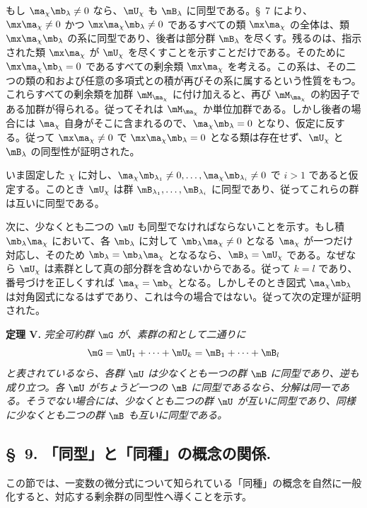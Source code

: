 \documentclass[11pt]{article}
\begin{document}
もし $\ma_\chi\mb_\lambda\ne0$ なら、$\mU_\chi$ も $\mB_\lambda$ に同型である。\S~7 により、$\mx\ma_\chi\ne0$ かつ $\mx\ma_\chi\mb_\lambda\ne0$ であるすべての類 $\mx\ma_\chi$ の全体は、類 $\mx\ma_\chi\mb_\lambda$ の系に同型であり、後者は部分群 $\mB_\lambda$ を尽くす。残るのは、指示された類 $\mx\ma_\chi$ が $\mU_\chi$ を尽くすことを示すことだけである。そのために $\mx\ma_\chi\mb_\lambda=0$ であるすべての剰余類 $\mx\ma_\chi$ を考える。この系は、その二つの類の和および任意の多項式との積が再びその系に属するという性質をもつ。これらすべての剰余類を加群 $\mM_{\ma_\chi}$ に付け加えると、再び $\mM_{\ma_\chi}$ の約因子である加群が得られる。従ってそれは $\mM_{\ma_\chi}$ か単位加群である。しかし後者の場合には $\ma_\chi$ 自身がそこに含まれるので、$\ma_\chi\mb_\lambda=0$ となり、仮定に反する。従って $\mx\ma_\chi\ne0$ で $\mx\ma_\chi\mb_\lambda=0$ となる類は存在せず、$\mU_\chi$ と $\mB_\lambda$ の同型性が証明された。

いま固定した $\chi$ に対し、$\ma_\chi\mb_{\lambda_1}\ne0,
\ldots,\ma_\chi\mb_{\lambda_i}\ne0$ で $i>1$ であると仮定する。このとき $\mU_\chi$ は群 $\mB_{\lambda_1},\ldots,\mB_{\lambda_i}$ に同型であり、従ってこれらの群は互いに同型である。

次に、少なくとも二つの $\mU$ も同型でなければならないことを示す。もし積 $\mb_\lambda\ma_\chi$ において、各 $\mb_\lambda$ に対して $\mb_\lambda\ma_\chi\ne0$ となる $\ma_\chi$ が一つだけ対応し、そのため $\mb_\lambda=\mb_\lambda\ma_\chi$ となるなら、$\mB_\lambda=\mU_\chi$ である。なぜなら $\mU_\chi$ は素群として真の部分群を含めないからである。従って $k=l$ であり、番号づけを正しくすれば $\ma_\chi=\mb_\chi$ となる。しかしそのとき図式 $\ma_\chi\mb_\lambda$ は対角図式になるはずであり、これは今の場合ではない。従って次の定理が証明された。

\textbf{定理 V.} \emph{完全可約群 $\mG$ が、素群の和として二通りに
\[
 \mG=\mU_1+\cdots+\mU_k=\mB_1+\cdots+\mB_l
\]
と表されているなら、各群 $\mU$ は少なくとも一つの群 $\mB$ に同型であり、逆も成り立つ。各 $\mU$ がちょうど一つの $\mB$ に同型であるなら、分解は同一である。そうでない場合には、少なくとも二つの群 $\mU$ が互いに同型であり、同様に少なくとも二つの群 $\mB$ も互いに同型である。}

\subsection*{\S~9. 「同型」と「同種」の概念の関係.}

この節では、一変数の微分式について知られている「同種」の概念を自然に一般化すると、対応する剰余群の同型性へ導くことを示す。
\end{document}
